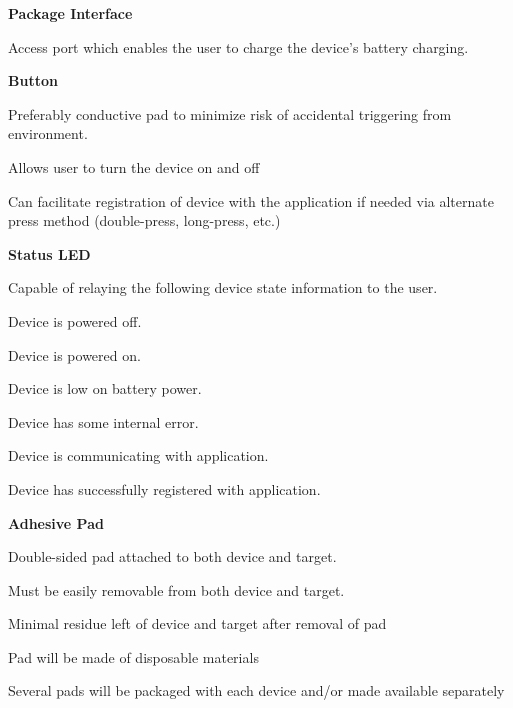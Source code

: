 \documentclass[12pt]{article}
\begin{document}
\begin{packed_enum}
\begin{packed_enum}
\begin{packed_enum}
		  			\item \textbf{Package Interface}
		  			\begin{packed_enum}
		  				\item Access port which enables the user to charge the device's battery charging.
		  				\item \textbf{Button}
		  				\begin{packed_enum}
		  					\item Preferably conductive pad to minimize risk of accidental triggering from environment.
		  					\item Allows user to turn the device on and off
		  					\item Can facilitate registration of device with the application if needed via alternate press method (double-press, long-press, etc.)
		  					\end{packed_enum}
		  				\item \textbf{Status LED}
		  				\begin{packed_enum}
		  					\item Capable of relaying the following device state information to the user.
		  					\begin{packed_enum}
		  						\item Device is powered off.
		  						\item Device is powered on.
		  						\item Device is low on battery power.
		  						\item Device has some internal error.
		  						\item Device is communicating with application.
		  						\item Device has successfully registered with application.
		  						\end{packed_enum}
		  					\end{packed_enum}
		  				\end{packed_enum}
		  			\item \textbf{Adhesive Pad}
		  			\begin{packed_enum}
		  				\item Double-sided pad attached to both device and target.
		  				\item Must be easily removable from both device and target.
		  				\item Minimal residue left of device and target after removal of pad
		  				\item Pad will be made of disposable materials
		  				\item Several pads will be packaged with each device and/or made available separately

\end{packed_enum}
\end{packed_enum}
\end{packed_enum}
\end{packed_enum}
\end{document}
